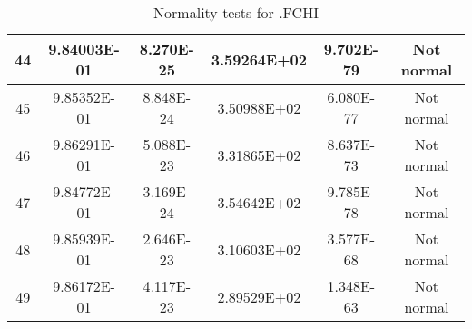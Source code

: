 \begin{table}[h]
\begin{tabular}{|c|c|c|c|c|c|}
		44 & 9.84003E-01 & 8.270E-25 & 3.59264E+02 & 9.702E-79 & Not normal\\\hline
		45 & 9.85352E-01 & 8.848E-24 & 3.50988E+02 & 6.080E-77 & Not normal\\\hline
		46 & 9.86291E-01 & 5.088E-23 & 3.31865E+02 & 8.637E-73 & Not normal\\\hline
		47 & 9.84772E-01 & 3.169E-24 & 3.54642E+02 & 9.785E-78 & Not normal\\\hline
		48 & 9.85939E-01 & 2.646E-23 & 3.10603E+02 & 3.577E-68 & Not normal\\\hline
		49 & 9.86172E-01 & 4.117E-23 & 2.89529E+02 & 1.348E-63 & Not normal\\\hline
	\end{tabular}
	\caption{Normality tests for .FCHI}
	\label{tab:normality_tests_FCHI}
\end{table}
